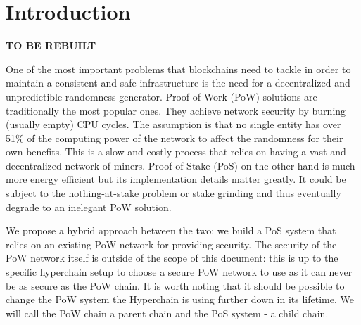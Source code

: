 \section{Introduction}

\textbf{TO BE REBUILT}

One of the most important problems that blockchains need to tackle in order to
maintain a consistent and safe infrastructure is the need for a decentralized and
unpredictible randomness generator. Proof of Work (PoW) solutions are
traditionally the most popular ones. They achieve network security by burning
(usually empty) CPU cycles. The assumption is that no single entity has over 51\%
of the computing power of the network to affect the randomness for their own
benefits. This is a slow and costly process that relies on having
a vast and decentralized network of miners. Proof of Stake (PoS) on the other
hand is much more energy efficient but its implementation details matter
greatly. It could be subject to the nothing-at-stake problem or stake grinding and
thus eventually degrade to an inelegant PoW solution.

We propose a hybrid approach between the two: we build a PoS system that
relies on an existing PoW network for providing security. The security of the
PoW network itself is outside of the scope of this document: this is up to
the specific hyperchain setup to choose a secure PoW network to use as it
can never be as secure as the PoW chain. It is worth noting that it should
be possible to change the PoW system the Hyperchain is using further down
in its lifetime. We will call the PoW chain a parent chain and the PoS system
- a child chain.


